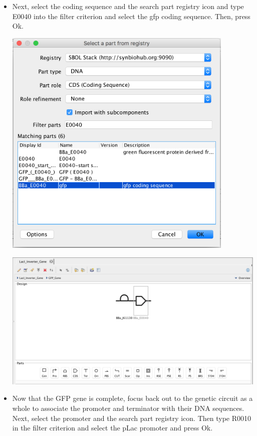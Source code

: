 \documentclass[titlepage,11pt]{article}
\begin{document}
\begin{itemize}
\item Next, select the coding sequence and the search part registry icon and type E0040 into the filter criterion and select the gfp coding sequence. Then, press Ok.

\begin{center}
\includegraphics[width=110mm]{screenshots/PartCDSGFP}
\end{center}

\begin{center}
\includegraphics[width=160mm]{screenshots/PartGFPGeneComplete}
\end{center}

\item Now that the GFP gene is complete, focus back out to the genetic circuit as a whole to associate the promoter and terminator with their DNA sequences. Next, select the promoter and the search part registry icon. Then type R0010 in the filter criterion and select the pLac promoter and press Ok.


\end{itemize}
\end{document}
